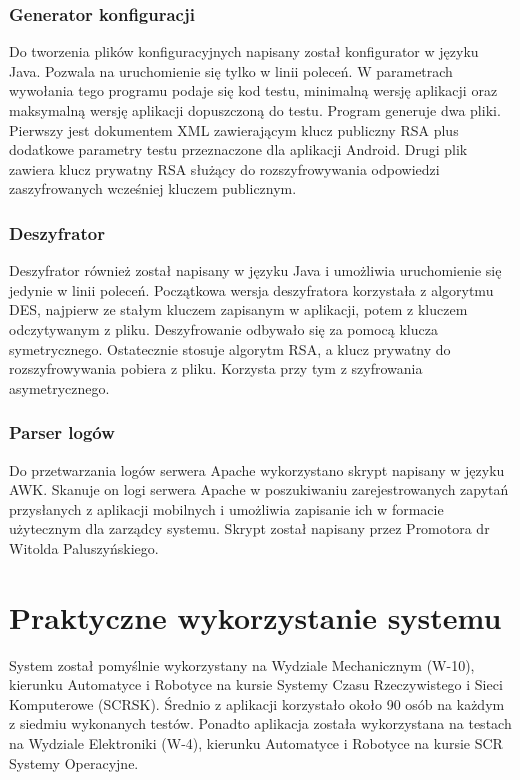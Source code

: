 \documentclass[eng]{mgr}
\begin{document}
			\subsection{Generator konfiguracji}
			Do tworzenia plików konfiguracyjnych napisany został konfigurator w języku Java. Pozwala na uruchomienie się tylko w linii poleceń. W parametrach wywołania tego programu podaje się kod testu, minimalną wersję aplikacji oraz maksymalną wersję aplikacji dopuszczoną do testu. Program generuje dwa pliki. Pierwszy jest dokumentem XML zawierającym klucz publiczny RSA plus dodatkowe parametry testu przeznaczone dla aplikacji Android. Drugi plik zawiera klucz prywatny RSA służący do rozszyfrowywania odpowiedzi zaszyfrowanych wcześniej kluczem publicznym.
			
			\subsection{Deszyfrator}
			Deszyfrator również został napisany w języku Java i umożliwia uruchomienie się jedynie w linii poleceń. Początkowa wersja deszyfratora korzystała z algorytmu DES, najpierw ze stałym kluczem zapisanym w aplikacji, potem z kluczem odczytywanym z pliku. Deszyfrowanie odbywało się za pomocą klucza symetrycznego. Ostatecznie stosuje algorytm RSA, a klucz prywatny do rozszyfrowywania pobiera z pliku. Korzysta przy tym z szyfrowania asymetrycznego.
			
			\subsection{Parser logów}
			Do przetwarzania logów serwera Apache wykorzystano skrypt napisany w języku AWK. Skanuje on logi serwera Apache w poszukiwaniu zarejestrowanych zapytań przysłanych z aplikacji mobilnych i umożliwia zapisanie ich w formacie użytecznym dla zarządcy systemu. Skrypt został napisany przez Promotora dr Witolda Paluszyńskiego.
			

	\chapter{Praktyczne wykorzystanie systemu}
	
	System został pomyślnie wykorzystany na Wydziale Mechanicznym (W-10), kierunku Automatyce i Robotyce na kursie Systemy Czasu Rzeczywistego i Sieci Komputerowe (SCRSK). Średnio z aplikacji korzystało około 90 osób na każdym z siedmiu wykonanych testów. Ponadto aplikacja została wykorzystana na testach na Wydziale Elektroniki (W-4), kierunku Automatyce i Robotyce na kursie SCR Systemy Operacyjne.
	
\end{document}

